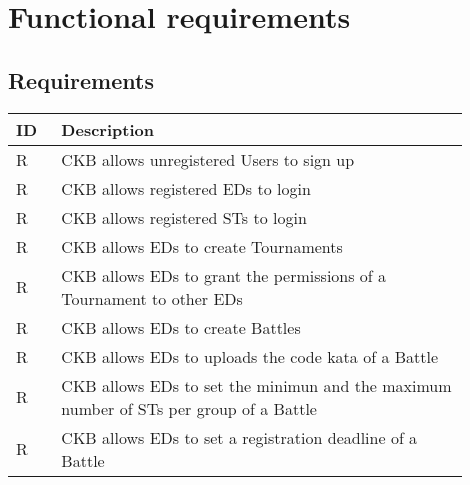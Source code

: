 \section{Functional requirements}
\label{sec:functional_requirements}%

\subsection{Requirements}
\label{subsec:requirements3}%
\setcounter{req}{1}
\newcommand{\creq}{\thereq\stepcounter{req}}
\begin{center}
    \begin{longtable}{|l|p{0.9\linewidth}|}
        \hline
        \textbf{ID} & \textbf{Description}                                                                                                                             \\
        \hline
        R\creq      & CKB allows unregistered Users to sign up                                                                    \\
        \hline
        R\creq      & CKB allows registered EDs to login                                                                    \\
        \hline
        R\creq      & CKB allows registered STs to login                                                                    \\
        \hline
        R\creq      & CKB allows EDs to create Tournaments                                                                    \\
        \hline
        R\creq      & CKB allows EDs to grant the permissions of a Tournament to other EDs                                                                 \\
        \hline
        R\creq      & CKB allows EDs to create Battles                                                                    \\
        \hline
        R\creq      & CKB allows EDs to uploads the code kata of a Battle                                                                   \\
        \hline
        R\creq      & CKB allows EDs to set the minimun and the maximum number of STs per group of a Battle                                                                    \\
        \hline
        R\creq      & CKB allows EDs to set a registration deadline of a Battle                                                                 \\

\end{longtable}
\end{center}
